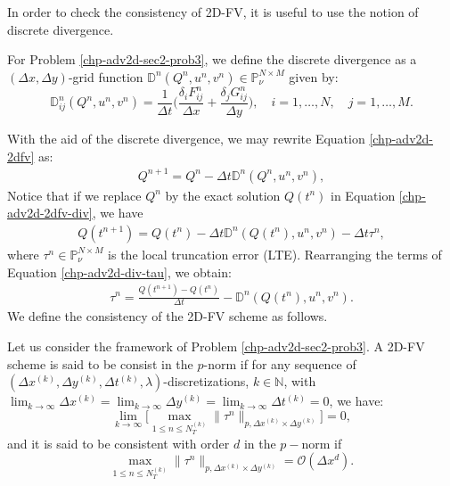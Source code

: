In order to check the consistency of 2D-FV, it is useful to use the notion of discrete divergence.
\begin{definition}
	\label{chp-adv2d-def-div}
	For Problem \ref{chp-adv2d-sec2-prob3}, we define the discrete divergence as a 
    $(\Delta x, \Delta y)$-grid function $\mathbb{D}^n(Q^n,u^n,v^n) \in \mathbb{P}^{N\times M}_{\nu}$
	given by:
	\begin{equation}
		\label{chp-adv2d-def-div-eq}
		\mathbb{D}_{ij}^n(Q^n,u^n,v^n)=  \frac{1}{\Delta t}
        \bigg(\frac{\delta_i {F}_{ij}^{n}}{\Delta x} + \frac{\delta_j {G}_{ij}^{n}}{\Delta y} \bigg), 
        \quad i = 1, \ldots, N, \quad j=1, \ldots,M.
	\end{equation}
\end{definition}
With the aid of the discrete divergence, we may rewrite Equation \eqref{chp-adv2d-2dfv} as:
\begin{align}
    \label{chp-adv2d-2dfv-div}
    {Q}^{n+1} =  {Q}^{n} - \Delta t \mathbb{D}^n(Q^n,u^n,v^n),
\end{align}
Notice that if we replace  $Q^n$ by the exact solution $Q(t^n)$ in Equation \eqref{chp-adv2d-2dfv-div}, we have
\begin{align}
    \label{chp-adv2d-div-tau}
    {Q}(t^{n+1}) =  {Q}(t^{n}) - \Delta t \mathbb{D}^n(Q(t^n),u^n,v^n) - \Delta t \tau^n,
\end{align}
where $\tau^n \in \mathbb{P}^{N\times M}_{\nu}$ is the local truncation error (LTE).
Rearranging the terms of Equation \eqref{chp-adv2d-div-tau}, we obtain:
\begin{align}
    \label{chp-adv2d-div-tau2}
    \tau^n =  \frac{{Q}(t^{n+1}) - {Q}(t^{n})}{\Delta t} - \mathbb{D}^n(Q(t^n),u^n,v^n).
\end{align}
We define the consistency of the 2D-FV scheme as follows.
\begin{definition}[Consistency]
	\label{chp-adv2d-def-cons}
	Let us consider the framework of Problem \ref{chp-adv2d-sec2-prob3}.
	A 2D-FV scheme is said to be consist in the $p$-norm if for any sequence of
	$(\Delta x^{(k)},\Delta y^{(k)}, \Delta t^{(k)},\lambda)$-discretizations, 
	$k \in \mathbb{N}$, with
    $\lim_{k\to \infty }{\Delta x^{(k)}} =\lim_{k\to \infty }{\Delta y^{(k)}}= \lim_{k\to \infty }{\Delta t^{(k)}} = 0$, we have:
	\begin{equation*}
		\lim_{k \to \infty}\bigg[ {\max_{1\leq n\leq N_T^{(k)}}}{\|\tau^n\|_{p,\Delta x^{(k)} \times \Delta y^{(k)}}} \bigg] = 0,
	\end{equation*}
	and it is said to be consistent with order $d$ in the $p-$norm if
	\begin{equation*}
		{\max_{1\leq n\leq N_T^{(k)}}}{\|\tau^n\|_{p,\Delta x^{(k)} \times \Delta y^{(k)}}} = \mathcal{O}(\Delta x^d).
	\end{equation*}
\end{definition}

